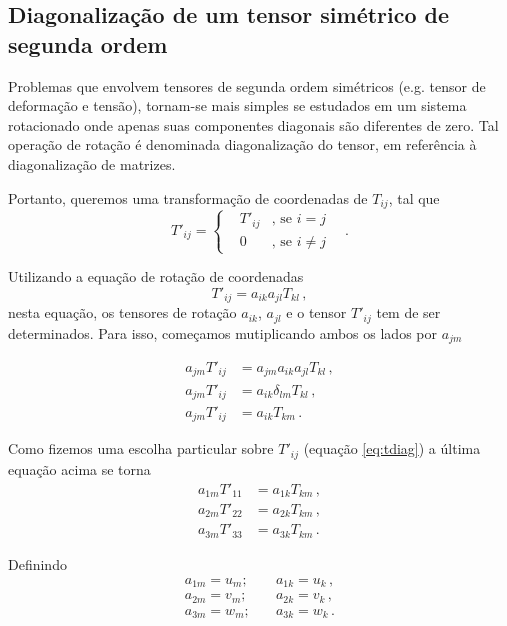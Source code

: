 \subsection{Diagonaliza\c{c}\~ao de um tensor sim\'etrico de segunda ordem}

Problemas que envolvem tensores de segunda ordem sim\'etricos (e.g. tensor de
deforma\c{c}\~ao e tens\~ao), tornam-se mais simples se estudados em um sistema
rotacionado onde apenas suas componentes diagonais s\~ao diferentes de zero.
Tal opera\c{c}\~ao de rota\c{c}\~ao \'e denominada diagonaliza\c{c}\~ao do
tensor, em refer\^encia \`a diagonaliza\c{c}\~ao de matrizes.

Portanto, queremos uma transforma\c{c}\~ao de coordenadas de $T_{ij}$, tal que
\begin{equation}
  T'_{ij}=\left\{\begin{aligned}
    &T'_{ij}&,\, \text{se } i=j& \\
     &0&,\, \text{se } i\neq j&
\end{aligned}\right.
\, .
  \label{eq:tdiag}
\end{equation}

Utilizando a equa\c{c}\~ao de rota\c{c}\~ao de coordenadas
\begin{equation}
  T'_{ij} = a_{ik}a_{jl}T_{kl} \,,
\end{equation}
nesta equa\c{c}\~ao, os tensores de rota\c{c}\~ao $a_{ik}$, $a_{jl}$ e o tensor
$T'_{ij}$ tem de ser determinados. Para isso, come\c{c}amos mutiplicando ambos os lados por $a_{jm}$

\begin{align}
  a_{jm}T'_{ij} &= a_{jm}a_{ik}a_{jl}T_{kl} \, ,\\
  a_{jm}T'_{ij} &= a_{ik}\delta_{lm}T_{kl} \, ,\\
  a_{jm}T'_{ij} &=a_{ik}T_{km} \,. \label{eq:eigvect1}
\end{align}

Como fizemos uma escolha particular sobre $T'_{ij}$ (equa\c{c}\~ao
\ref{eq:tdiag}) a \'ultima equa\c{c}\~ao acima se torna
\begin{align}
  a_{1m}T'_{11}  &=  a_{1k}T_{km}\, , \label{eq:eigvect2start}\\
  a_{2m}T'_{22}  &=  a_{2k}T_{km} \, ,\\
  a_{3m}T'_{33}  &=  a_{3k}T_{km} \,.\label{eq:eigvect2end}
\end{align}

Definindo
\begin{align}
  a_{1m} = u_{m}; \quad  &a_{1k} = u_{k} \, , \\
  a_{2m} = v_{m}; \quad  &a_{2k} = v_{k} \, , \\
  a_{3m} = w_{m}; \quad  &a_{3k} = w_{k} \, .
\end{align}

